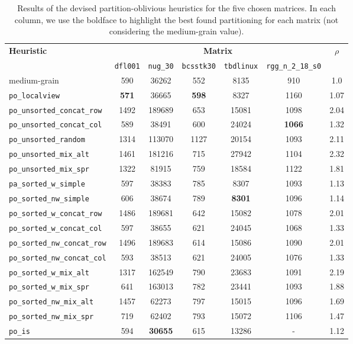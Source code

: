 \begin{table}[h]
	\centering

	\renewcommand{\arraystretch}{1.2}
	\begin{tabular}{|l||c|c|c|c|c||c|}
		\hline
		\multirow{2}{*}{\textbf{Heuristic}} &  \multicolumn{5}{|c||}{\textbf{Matrix}} & \multirow{2}{*}{$\rho$} \\ \cline{2-6}
		& \texttt{dfl001} & \texttt{nug\_30} & \texttt{bcsstk30} & \texttt{tbdlinux} & \texttt{rgg\_n\_2\_18\_s0} & \\ \hline
		medium-grain & 590 & 36262 & 552 & 8135 & 910 & 1.0 \\ \hline %
		\verb|po_localview|& \textbf{571} & 36665 & \textbf{598} & 8327 & 1160  & 1.07 \\  %
		\verb|po_unsorted_concat_row|& 1492 & 189689 & 653 & 15081 & 1098 & 2.04 \\ %
		\verb|po_unsorted_concat_col|& 589 & 38491  & 600 & 24024 & \textbf{1066} & 1.32 \\ %
		\verb|po_unsorted_random|& 1314 & 113070 & 1127 & 20154 & 1093 & 2.11 \\  %
		\verb|po_unsorted_mix_alt|& 1461 & 181216 & 715 & 27942 & 1104 & 2.32 \\  %
		\verb|po_unsorted_mix_spr|& 1322 & 81915 & 759 & 18584 & 1122 & 1.81 \\  %
		\verb|pa_sorted_w_simple|& 597 & 38383 & 785  & 8307 & 1093 & 1.13 \\ %
		\verb|po_sorted_nw_simple|& 606 & 38674 & 789 & \textbf{8301} & 1096 & 1.14 \\ %
		\verb|po_sorted_w_concat_row|& 1486 & 189681 & 642 & 15082 & 1078 & 2.01 \\ %
		\verb|po_sorted_w_concat_col|& 597 & 38655 & 621 & 24045 & 1068 & 1.33 \\  %
		\verb|po_sorted_nw_concat_row|& 1496 & 189683 & 614 & 15086 & 1090 & 2.01 \\ %
		\verb|po_sorted_nw_concat_col|& 593 & 38513 & 621 & 24005 & 1076 & 1.33 \\ %
		\verb|po_sorted_w_mix_alt|& 1317 & 162549 & 790 & 23683 & 1091 & 2.19 \\ %
		\verb|po_sorted_w_mix_spr|& 641 & 163013 & 782 & 23441 & 1093 & 1.88 \\ %
		\verb|po_sorted_nw_mix_alt|& 1457 & 62273 & 797 & 15015 & 1096 & 1.69 \\ %
		\verb|po_sorted_nw_mix_spr|& 719 & 62402 & 793 & 15072 & 1106 & 1.47 \\  %
		\verb|po_is|& 594 & \textbf{30655} & 615 & 13286 & -  & 1.12 \\ %
		\hline
	\end{tabular}
	\caption{Results of the devised partition-oblivious heuristics for the five chosen matrices. In each column, we use the boldface to highlight the best found partitioning for each matrix (not considering the medium-grain value). } \label{tab:preliminary_po}
\end{table}

